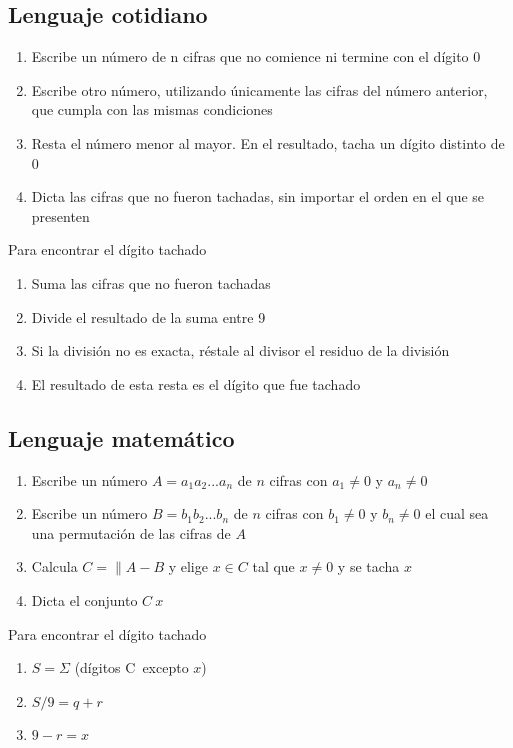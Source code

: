 \subsection{Lenguaje cotidiano}
    \begin{enumerate}
        \item Escribe un número de n cifras que no comience ni termine con el dígito 0
        \item Escribe otro número, utilizando únicamente las cifras del número anterior, que cumpla con las mismas condiciones
        \item Resta el número menor al mayor. En el resultado, tacha un dígito distinto de 0
        \item Dicta las cifras que no fueron tachadas, sin importar el orden en el que se presenten
    \end{enumerate}
    Para encontrar el dígito tachado
    \begin{enumerate}
        \item Suma las cifras que no fueron tachadas
        \item Divide el resultado de la suma entre 9
        \item Si la división no es exacta, réstale al divisor el residuo de la división
        \item El resultado de esta resta es el dígito  que fue tachado
    \end{enumerate}

\subsection{Lenguaje matemático}
    \begin{enumerate}
        \item Escribe un número $A=a_1a_2...a_n$ de $n$ cifras con $a_1 \neq 0$ y $a_n\neq 0$
        \item Escribe un número $B=b_1b_2...b_n$ de $n$ cifras con $b_1 \neq 0$ y $b_n\neq 0$ el cual sea una permutación de las cifras de $A$
        \item Calcula $C=\|{A-B}$ y elige $x\in C$ tal que $x\neq 0$ y se tacha $x$
        \item Dicta el conjunto $C\ {x}$
    \end{enumerate}
    Para encontrar el dígito tachado
    \begin{enumerate}
        \item $S=\Sigma $ (dígitos C\ excepto $x$)
        \item $S/9 = q+r$
        \item $9-r = x$
    \end{enumerate}